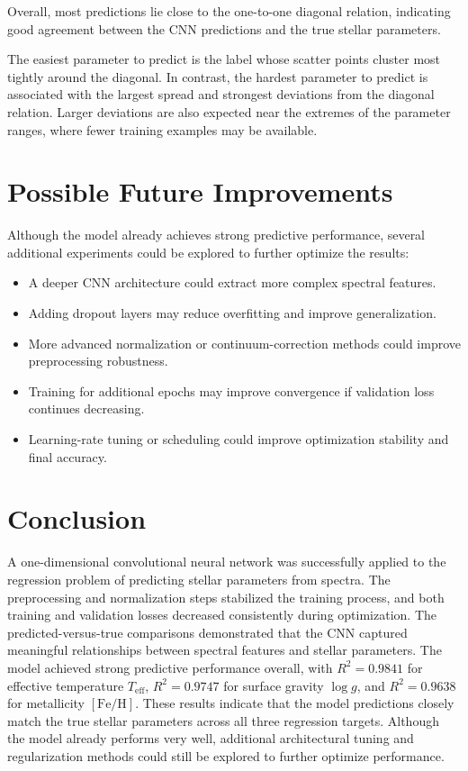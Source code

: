 Overall, most predictions lie close to the one-to-one diagonal relation, indicating good agreement between the CNN predictions and the true stellar parameters.

The easiest parameter to predict is the label whose scatter points cluster most tightly around the diagonal. In contrast, the hardest parameter to predict is associated with the largest 
spread and strongest deviations from the diagonal relation. Larger deviations are also expected near the extremes of the parameter ranges, where fewer training examples may be available.

\section{Possible Future Improvements}
Although the model already achieves strong predictive performance, several additional experiments could be explored to further optimize the results:

\begin{itemize}
    \item A deeper CNN architecture could extract more complex spectral features.
    \item Adding dropout layers may reduce overfitting and improve generalization.
    \item More advanced normalization or continuum-correction methods could improve preprocessing robustness.
    \item Training for additional epochs may improve convergence if validation loss continues decreasing.
    \item Learning-rate tuning or scheduling could improve optimization stability and final accuracy.
\end{itemize}

\section{Conclusion}
A one-dimensional convolutional neural network was successfully applied to the regression problem of predicting stellar parameters from spectra. The preprocessing and normalization steps 
stabilized the training process, and both training and validation losses decreased consistently during optimization.
The predicted-versus-true comparisons demonstrated that the CNN captured meaningful relationships between spectral features and stellar parameters. The model achieved strong predictive 
performance overall, with $R^2 = 0.9841$ for effective temperature $T_{\mathrm{eff}}$, $R^2 = 0.9747$ for surface gravity $\log g$, and $R^2 = 0.9638$ for metallicity 
$[\mathrm{Fe}/\mathrm{H}]$. These results indicate that the model predictions closely match the true stellar parameters across all three regression targets.
Although the model already performs very well, additional architectural tuning and regularization methods could still be explored to further optimize performance.

